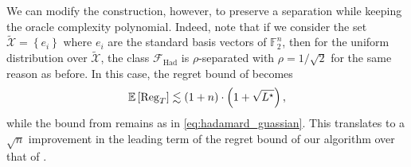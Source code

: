 We can modify the construction, however, to preserve a separation while keeping the oracle complexity polynomial.  Indeed, note that if we  consider the set $ \tilde{\mathcal{X}} = \left\{ e_i  \right\} $ where $e_i$ are the standard basis vectors of $ \mathbb{F}_2^n $, then for the uniform distribution over $ \tilde{\mathcal{X}} $, the class $ \mathcal{F}_{\mathrm{Had}} $ is $ \rho $-separated with $ \rho = 1/ \sqrt{2} $ for the same reason as before.
In this case, the regret bound of \citet{wang2022adaptive} becomes
\begin{align}
    \mathbb{E}\left[ \operatorname{Reg}_T \right] \lesssim   \left( 1 + n \right) \cdot \left(1 +  \sqrt{L^\star} \right), 
\end{align}
while the bound from  remains as in \eqref{eq:hadamard_guassian}.  This translates to a $\sqrt{n}$ improvement in the leading term of the regret bound of our algorithm over that of \citet{wang2022adaptive}.













